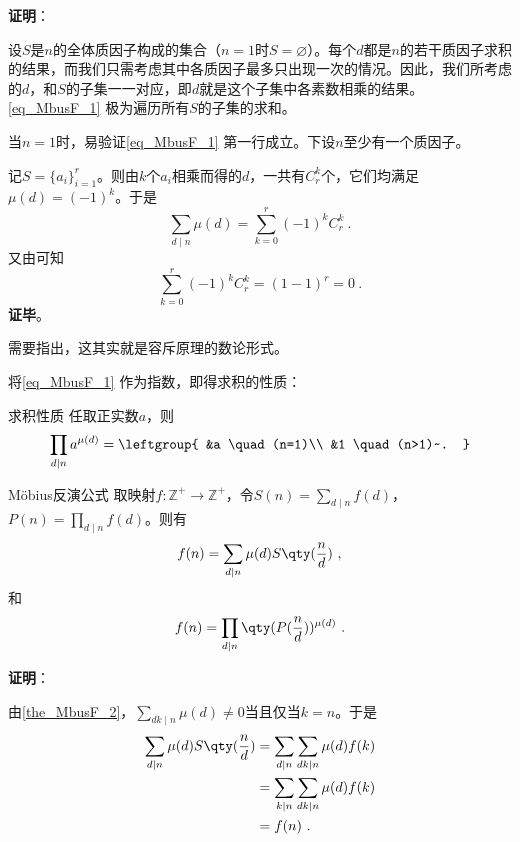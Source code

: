 \textbf{证明}：

设$S$是$n$的全体质因子构成的集合（$n=1$时$S=\varnothing$）。每个$d$都是$n$的若干质因子求积的结果，而我们只需考虑其中各质因子最多只出现一次的情况。因此，我们所考虑的$d$，和$S$的子集一一对应，即$d$就是这个子集中各素数相乘的结果。\autoref{eq_MbusF_1} 极为遍历所有$S$的子集的求和。

当$n=1$时，易验证\autoref{eq_MbusF_1} 第一行成立。下设$n$至少有一个质因子。

记$S=\{a_i\}_{i=1}^r$。则由$k$个$a_i$相乘而得的$d$，一共有$C^k_r$个，它们均满足$\mu(d)=(-1)^k$。于是
\begin{equation}
\sum_{d\mid n}\mu(d)=\sum_{k=0}^r(-1)^kC^k_r~.
\end{equation}
又由可知
\begin{equation}
\sum_{k=0}^r(-1)^kC^k_r=(1-1)^r=0~.
\end{equation}
\textbf{证毕}。

需要指出，这其实就是容斥原理的数论形式。

将\autoref{eq_MbusF_1} 作为指数，即得求积的性质：


\begin{corollary}{求积性质}\label{cor_MbusF_1}
任取正实数$a$，则
\begin{equation}
\prod_{d\mid n}a^{\mu(d)}=
\leftgroup{
    &a \quad (n=1)\\
    &1 \quad (n>1)~.
}
\end{equation}
\end{corollary}






\begin{theorem}{Möbius反演公式}\label{the_MbusF_3}
取映射$f:\mathbb{Z}^+\to\mathbb{Z}^+$，令$S(n)=\sum_{d\mid n}f(d)$，$P(n)=\prod_{d\mid n}f(d)$。则有
\begin{equation}
f(n) = \sum_{d\mid n}\mu(d)S\qty(\frac{n}{d})~,
\end{equation}
和
\begin{equation}
f(n) = \prod_{d\mid n}\qty(P(\frac{n}{d}))^{\mu(d)}~.
\end{equation}
\end{theorem}

\textbf{证明}：

由\autoref{the_MbusF_2}，$\sum_{dk\mid n}\mu(d)\neq 0$当且仅当$k=n$。于是
\begin{equation}
\begin{aligned}
\sum_{d\mid n}\mu(d)S\qty(\frac{n}{d})&=\sum_{d\mid n}\sum_{dk\mid n}\mu(d)f(k)\\
&=\sum_{k\mid n}\sum_{dk\mid n}\mu(d)f(k)\\
&=f(n)~.
\end{aligned}
\end{equation}



